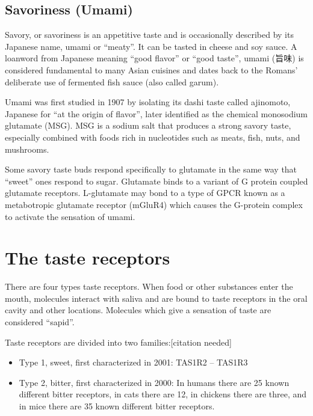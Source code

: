 \documentclass[]{book}
\providecommand{\tightlist}{%
  \setlength{\itemsep}{0pt}\setlength{\parskip}{0pt}}
\begin{document}
\hypertarget{savoriness-umami}{%
\subsection{Savoriness (Umami)}\label{savoriness-umami}}

Savory, or savoriness is an appetitive taste and is occasionally described by its Japanese name, umami or ``meaty''. It can be tasted in cheese and soy sauce. A loanword from Japanese meaning ``good flavor'' or ``good taste'', umami (旨味) is considered fundamental to many Asian cuisines and dates back to the Romans' deliberate use of fermented fish sauce (also called garum).

Umami was first studied in 1907 by isolating its dashi taste called ajinomoto, Japanese for ``at the origin of flavor'', later identified as the chemical monosodium glutamate (MSG). MSG is a sodium salt that produces a strong savory taste, especially combined with foods rich in nucleotides such as meats, fish, nuts, and mushrooms.

Some savory taste buds respond specifically to glutamate in the same way that ``sweet'' ones respond to sugar. Glutamate binds to a variant of G protein coupled glutamate receptors. L-glutamate may bond to a type of GPCR known as a metabotropic glutamate receptor (mGluR4) which causes the G-protein complex to activate the sensation of umami.

\hypertarget{the-taste-receptors}{%
\section{The taste receptors}\label{the-taste-receptors}}

There are four types taste receptors. When food or other substances enter the mouth, molecules interact with saliva and are bound to taste receptors in the oral cavity and other locations. Molecules which give a sensation of taste are considered ``sapid''.

Taste receptors are divided into two families:{[}citation needed{]}

\begin{itemize}
\tightlist
\item
  Type 1, sweet, first characterized in 2001: TAS1R2 -- TAS1R3
\item
  Type 2, bitter, first characterized in 2000: In humans there are 25 known different bitter receptors, in cats there are 12, in chickens there are three, and in mice there are 35 known different bitter receptors.
\end{itemize}
\end{document}
